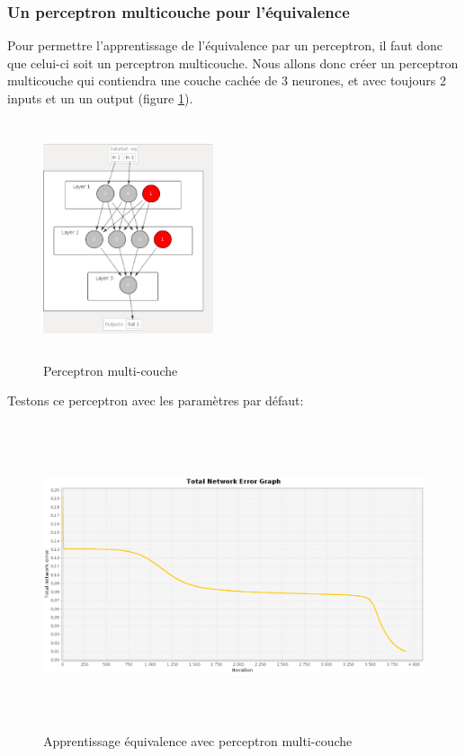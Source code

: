\documentclass[twoside,openright,a4paper,11pt,french]{article}
\begin{document}
\clearpage


\subsubsection{Un perceptron multicouche pour l'équivalence}

Pour permettre l'apprentissage de l'équivalence par un perceptron, il faut donc que
celui-ci soit un perceptron multicouche.
Nous allons donc créer un perceptron multicouche qui contiendra une couche cachée de
3 neurones, et avec toujours 2 inputs et un un output (figure \ref{fig:eqmq}).

\begin{figure}[ht]
\centering
\includegraphics[width=5cm,height=7cm]{./pics/eq/perceptron_multi.eps}
\caption{Perceptron multi-couche}
\label{fig:eqmq}
\end{figure}

Testons ce perceptron avec les paramètres par défaut:

\begin{figure}[ht]
\centering
\includegraphics[width=12cm,height=9cm]{./pics/eq/multi_eq_def.eps}
\caption{Apprentissage équivalence avec perceptron multi-couche}
\end{figure}
\end{document}
